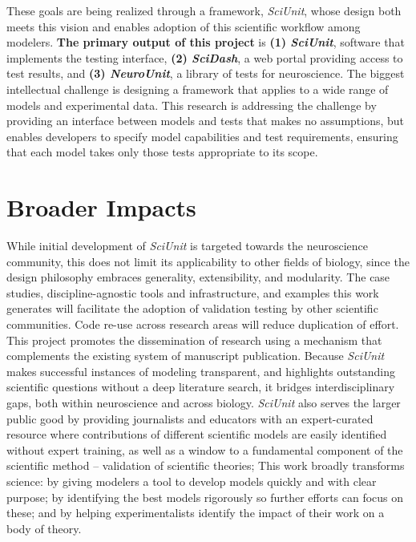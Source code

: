 \documentclass[11pt,letterpaper]{article}
\begin{document}
These goals are being realized through a framework, \textit{SciUnit}, whose design both meets this vision and enables adoption of this scientific workflow among modelers. 
\textbf{The primary output of this project} is \textbf{(1) \textit{SciUnit}}, software that implements the testing interface, \textbf{(2) \textit{SciDash}}, a web portal providing access to test results, and \textbf{(3) \textit{NeuroUnit}}, a library of tests for neuroscience.  
The biggest intellectual challenge is designing a framework that applies to a wide range of models and experimental data.  
This research is addressing the challenge by providing an interface between models and tests that makes no assumptions, but enables developers to specify model capabilities and test requirements, ensuring that each model takes only those tests appropriate to its scope.  

\section{Broader Impacts}
While initial development of \textit{SciUnit} is targeted towards the neuroscience community, this does not limit its applicability to other fields of biology, since the design philosophy embraces generality, extensibility, and modularity. 
The case studies, discipline-agnostic tools and infrastructure, and examples this work generates will facilitate the adoption of validation testing by other scientific communities.  
Code re-use across research areas will reduce duplication of effort.  
This project promotes the dissemination of research using a mechanism that complements the existing system of manuscript publication.  
Because \textit{SciUnit} makes successful instances of modeling transparent, and highlights outstanding scientific questions without a deep literature search, it bridges interdisciplinary gaps, both within neuroscience and across biology. 
\textit{SciUnit} also serves the larger public good by providing journalists and educators with an expert-curated resource where contributions of different scientific models are easily identified without expert training, as well as a window to a fundamental component of the scientific method – validation of scientific theories;
This work broadly transforms science: by giving modelers a tool to develop models quickly and with clear purpose; 
by identifying the best models rigorously so further efforts can focus on these; and by helping experimentalists identify the impact of their work on a body of theory.
\end{document}
